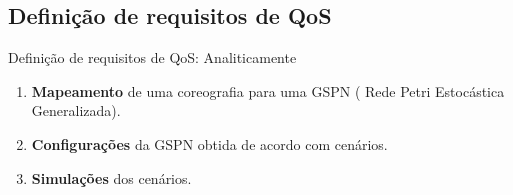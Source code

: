 \documentclass[xcolor=svgnames]{beamer}
\begin{document}

\subsection{Definição de requisitos de QoS}
  \begin{frame}{Definição de requisitos de QoS: Analiticamente}
      \begin{enumerate}
	\item <1-> \textbf{Mapeamento} de uma coreografia para uma GSPN ( Rede Petri Estocástica Generalizada).
	\item <2-> \textbf{Configurações} da GSPN obtida de acordo com cenários.
	\item <3-> \textbf{Simulações} dos cenários.
      \end{enumerate}

  \end{frame}
  
\end{document}
